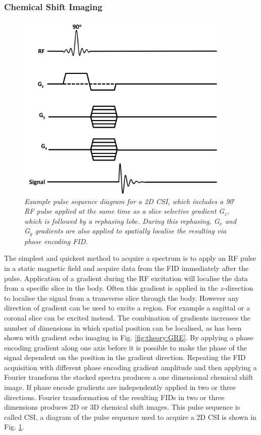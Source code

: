 \subsubsection{Chemical Shift Imaging}

\begin{figure}
    \centering
    \includegraphics[width=0.9\textwidth]{Figures/Theory/CSI_sequence.png}
    \caption{\textit{Example pulse sequence diagram for a 2D \ac{CSI}, which includes a 90$^\circ$ \ac{RF} pulse applied at the same time as a slice selective gradient G$_z$, which is followed by a rephasing lobe. During this rephasing, G$_x$ and G$_y$ gradients are also applied to spatially localise the resulting via phase encoding \ac{FID}.}}
    \label{fig:theory:CSI}
\end{figure}

The simplest and quickest method to acquire a spectrum is to apply an \ac{RF} pulse in a static magnetic field and acquire data from the FID immediately after the pulse. Application of a gradient during the \ac{RF} excitation will localise the data from a specific slice in the body. Often this gradient is applied in the $z$-direction to localise the signal from a transverse slice through the body. However any direction of gradient can be used to excite a region. For example a sagittal or a coronal slice can be excited instead. The combination of gradients increases the number of dimensions in which spatial position can be localised, as has been shown with gradient echo imaging in Fig. \ref{fig:theory:GRE}. By applying a phase encoding gradient along one axis before it is possible to make the phase of the signal dependent on the position in the gradient direction. Repeating the \ac{FID} acquisition with different phase encoding gradient amplitude and then applying a Fourier transform the stacked spectra produces a one dimensional chemical shift image. If phase encode gradients are independently applied in two or three directions. Fourier transformation of the resulting \ac{FID}s in two or three dimensions produces 2D or 3D chemical shift images. This pulse sequence is called \ac{CSI}, a diagram of the pulse sequence used to acquire a 2D \ac{CSI} is shown in Fig. \ref{fig:theory:CSI}. 

